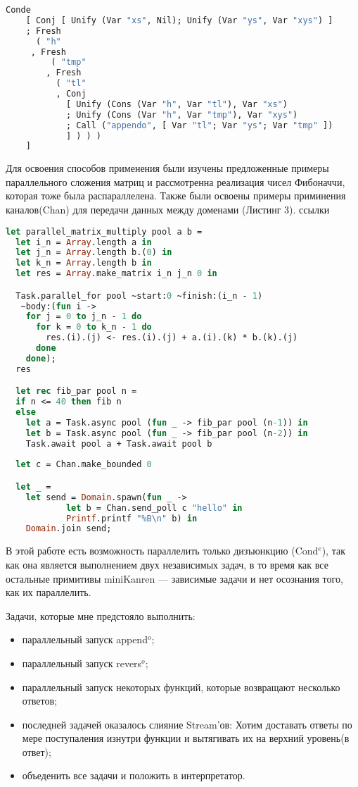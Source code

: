 \begin{lstlisting}[caption=\textbf{Append$^o$ в синтаксисе Unicanren (конкатенация двух списков)}, language=OCaml, frame=single]
  Conde
    [ Conj [ Unify (Var "xs", Nil); Unify (Var "ys", Var "xys") ]
    ; Fresh
      ( "h"
     , Fresh
         ( "tmp"
        , Fresh
          ( "tl"
          , Conj
            [ Unify (Cons (Var "h", Var "tl"), Var "xs")
            ; Unify (Cons (Var "h", Var "tmp"), Var "xys")
            ; Call ("appendo", [ Var "tl"; Var "ys"; Var "tmp" ])
            ] ) ) )
    ]
\end{lstlisting}

Для освоения способов применения были изучены предложенные примеры параллельного сложения матриц
и рассмотренна реализация чисел Фибоначчи, которая тоже была распараллелена. Также были освоены примеры приминения каналов(Chan) 
для передачи данных между доменами (Листинг 3).
ссылки

\begin{lstlisting}[caption=\textbf{Применение Domainslib 
  для сложения матриц, 
  чисел Фибоначчи и каналов}, language=OCaml, frame=single]
  let parallel_matrix_multiply pool a b =
  let i_n = Array.length a in
  let j_n = Array.length b.(0) in
  let k_n = Array.length b in
  let res = Array.make_matrix i_n j_n 0 in

  Task.parallel_for pool ~start:0 ~finish:(i_n - 1)
   ~body:(fun i ->
    for j = 0 to j_n - 1 do
      for k = 0 to k_n - 1 do
        res.(i).(j) <- res.(i).(j) + a.(i).(k) * b.(k).(j)
      done
    done);
  res

  let rec fib_par pool n =
  if n <= 40 then fib n
  else
    let a = Task.async pool (fun _ -> fib_par pool (n-1)) in
    let b = Task.async pool (fun _ -> fib_par pool (n-2)) in
    Task.await pool a + Task.await pool b
  
  let c = Chan.make_bounded 0

  let _ =
    let send = Domain.spawn(fun _ ->
            let b = Chan.send_poll c "hello" in
            Printf.printf "%B\n" b) in
    Domain.join send;
\end{lstlisting}

В этой работе есть возможность параллелить только дизъюнкцию (Cond$^e$), так как она является выполнением двух независимых задач,
в то время как все остальные примитивы miniKanren --- зависимые задачи и нет осознания того, как их параллелить.

Задачи, которые мне предстояло выполнить:
\begin{itemize}
  \item параллельный запуск append$^o$;
\item параллельный запуск revers$^o$;
\item параллельный запуск некоторых функций, которые возвращают
несколько ответов;
\item последней задачей оказалось слияние Stream’ов: Хотим доставать
ответы по мере поступаления изнутри функции и вытягивать их на
верхний уровень(в ответ);
\item объеденить все задачи и положить в интерпретатор.
\end{itemize}

